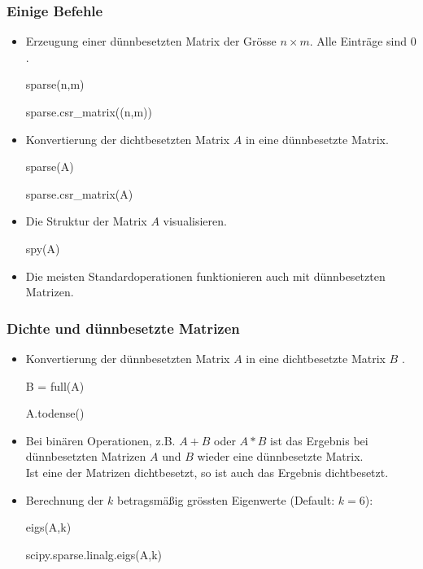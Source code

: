\documentclass[hyperref={xetex}]{beamer}
\begin{document}
\begin{frame}[fragile]\frametitle{Einige Befehle}
\begin{itemize}
\item Erzeugung einer d\"unnbesetzten Matrix
  der Gr\"osse $n \times m$. Alle Eintr\"age sind $0$.
\begin{matlabin}
sparse(n,m) 
\end{matlabin}
\begin{pyin}
sparse.csr_matrix((n,m))
\end{pyin}

\item Konvertierung der dichtbesetzten Matrix
  $A$ in eine d\"unnbesetzte Matrix.
\begin{matlabin}
sparse(A)
\end{matlabin}
\begin{pyin}
sparse.csr_matrix(A)
\end{pyin}

\item Die Struktur der Matrix $A$ visualisieren.
\begin{matlabin}
spy(A)
\end{matlabin}

\item Die meisten Standardoperationen funktionieren auch mit
  d\"unnbesetzten Matrizen.  
\end{itemize}
\end{frame}
% 
%
\begin{frame}[fragile]\frametitle{Dichte und d\"unnbesetzte Matrizen}
\begin{itemize}
\item Konvertierung der d\"unnbesetzten Matrix $A$ in eine dichtbesetzte Matrix $B$ .
\begin{matlabin}
B = full(A)
\end{matlabin}
\begin{pyin}
A.todense()  
\end{pyin}
\item Bei bin\"aren Operationen, z.B. $A+B$ oder $A*B$ ist das Ergebnis
  bei d\"unnbesetzten Matrizen $A$ und $B$ wieder eine d\"unnbesetzte
  Matrix. \\Ist eine der Matrizen dichtbesetzt, so ist auch das Ergebnis
  dichtbesetzt. 
\item Berechnung der $k$ betragsm\"a{\ss}ig  gr\"ossten Eigenwerte (Default: $k=6$):
\begin{matlabin}
eigs(A,k) 
\end{matlabin}
\begin{pyin}
scipy.sparse.linalg.eigs(A,k)
\end{pyin}
\end{itemize}
\end{frame}
\end{document}
